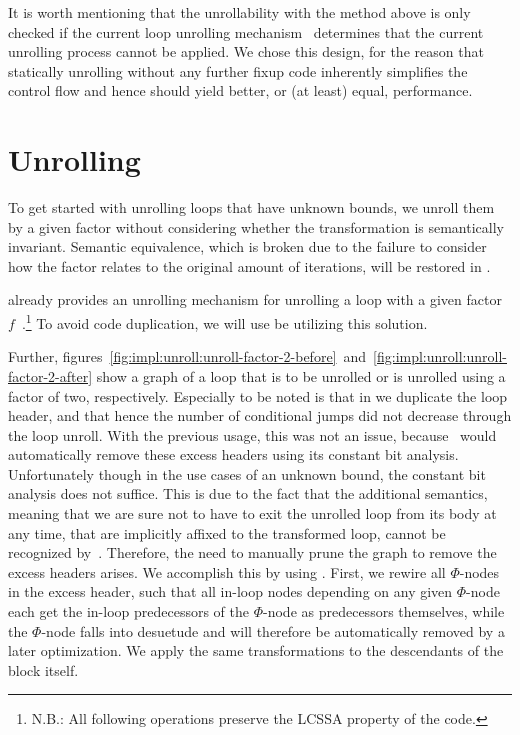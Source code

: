 It is worth mentioning that the unrollability with the method above is only checked if the current loop unrolling mechanism~\cite{aebi18bachelorarbeit} determines that the current unrolling process cannot be applied.
We chose this design, for the reason that statically unrolling without any further fixup code inherently simplifies the control flow and hence should yield better, or (at least) equal, performance.

\section{Unrolling}\label{sec:impl:unroll}

To get started with unrolling loops that have unknown bounds, we unroll them by a given factor without considering whether the transformation is semantically invariant.
Semantic equivalence, which is broken due to the failure to consider how the factor relates to the original amount of iterations, will be restored in .

\libFIRM{} already provides an unrolling mechanism for unrolling a loop with a given factor $f$~\cite{aebi18bachelorarbeit}.\footnote{N.B.: All following operations preserve the LCSSA property of the code.}
To avoid code duplication, we will use be utilizing this solution.

Further, figures~\ref{fig:impl:unroll:unroll-factor-2-before}~and~\ref{fig:impl:unroll:unroll-factor-2-after} show a \libFIRM{} graph of a loop that is to be unrolled or is unrolled using a factor of two, respectively.
Especially to be noted is that in  we duplicate the loop header, and that hence the number of conditional jumps did not decrease through the loop unroll.
With the previous usage, this was not an issue, because~\libFIRM{} would automatically remove these excess headers using its constant bit analysis.
Unfortunately though in the use cases of an unknown bound, the constant bit analysis does not suffice.
This is due to the fact that the additional semantics, meaning that we are sure not to have to exit the unrolled loop from its body at any time, that are implicitly affixed to the transformed loop, cannot be recognized by~\libFIRM.
Therefore, the need to manually prune the graph to remove the excess headers arises.
We accomplish this by using .
First, we rewire all $\Phi$-nodes in the excess header, such that all in-loop nodes depending on any given $\Phi$-node each get the in-loop predecessors of the $\Phi$-node as predecessors themselves, while the $\Phi$-node falls into desuetude and will therefore be automatically removed by a later optimization.
We apply the same transformations to the descendants of the block itself.

